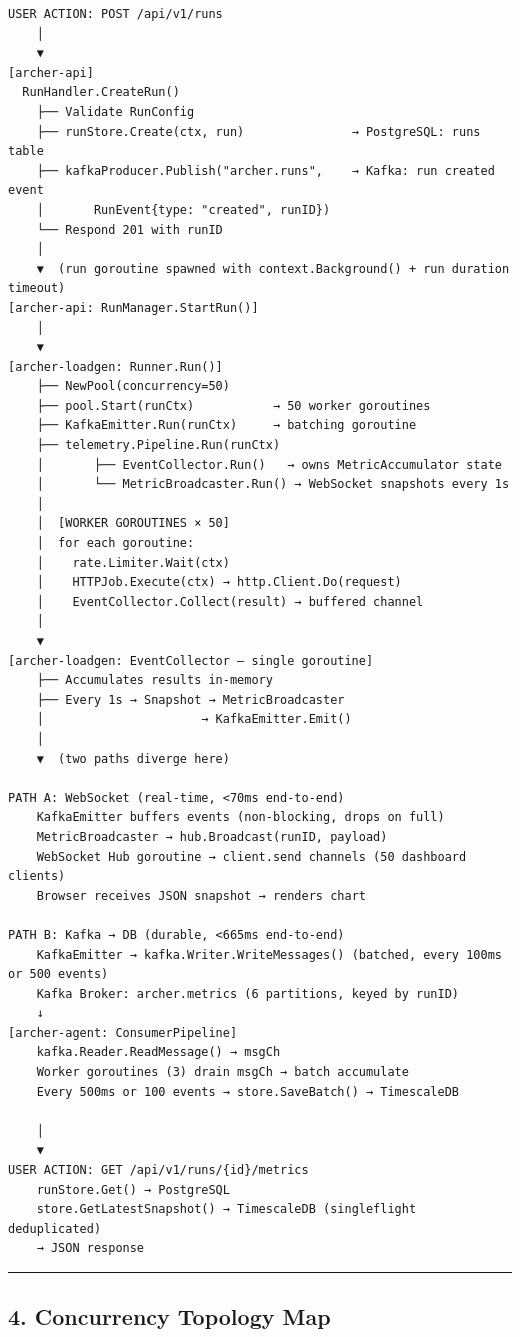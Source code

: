 \documentclass[
]{article}
\begin{document}
\begin{verbatim}
USER ACTION: POST /api/v1/runs
    │
    ▼
[archer-api]
  RunHandler.CreateRun()
    ├── Validate RunConfig
    ├── runStore.Create(ctx, run)               → PostgreSQL: runs table
    ├── kafkaProducer.Publish("archer.runs",    → Kafka: run created event
    │       RunEvent{type: "created", runID})
    └── Respond 201 with runID
    │
    ▼  (run goroutine spawned with context.Background() + run duration timeout)
[archer-api: RunManager.StartRun()]
    │
    ▼
[archer-loadgen: Runner.Run()]
    ├── NewPool(concurrency=50)
    ├── pool.Start(runCtx)           → 50 worker goroutines
    ├── KafkaEmitter.Run(runCtx)     → batching goroutine
    ├── telemetry.Pipeline.Run(runCtx)
    │       ├── EventCollector.Run()   → owns MetricAccumulator state
    │       └── MetricBroadcaster.Run() → WebSocket snapshots every 1s
    │
    │  [WORKER GOROUTINES × 50]
    │  for each goroutine:
    │    rate.Limiter.Wait(ctx)
    │    HTTPJob.Execute(ctx) → http.Client.Do(request)
    │    EventCollector.Collect(result) → buffered channel
    │
    ▼
[archer-loadgen: EventCollector — single goroutine]
    ├── Accumulates results in-memory
    ├── Every 1s → Snapshot → MetricBroadcaster
    │                      → KafkaEmitter.Emit()
    │
    ▼  (two paths diverge here)

PATH A: WebSocket (real-time, <70ms end-to-end)
    KafkaEmitter buffers events (non-blocking, drops on full)
    MetricBroadcaster → hub.Broadcast(runID, payload)
    WebSocket Hub goroutine → client.send channels (50 dashboard clients)
    Browser receives JSON snapshot → renders chart
    
PATH B: Kafka → DB (durable, <665ms end-to-end)
    KafkaEmitter → kafka.Writer.WriteMessages() (batched, every 100ms or 500 events)
    Kafka Broker: archer.metrics (6 partitions, keyed by runID)
    ↓
[archer-agent: ConsumerPipeline]
    kafka.Reader.ReadMessage() → msgCh
    Worker goroutines (3) drain msgCh → batch accumulate
    Every 500ms or 100 events → store.SaveBatch() → TimescaleDB

    │
    ▼
USER ACTION: GET /api/v1/runs/{id}/metrics
    runStore.Get() → PostgreSQL
    store.GetLatestSnapshot() → TimescaleDB (singleflight deduplicated)
    → JSON response
\end{verbatim}

\begin{center}\rule{0.5\linewidth}{0.5pt}\end{center}

\hypertarget{concurrency-topology-map}{%
\subsection{4. Concurrency Topology
Map}\label{concurrency-topology-map}}
\end{document}
